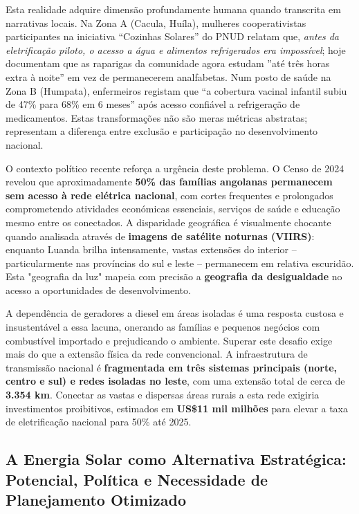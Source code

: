 \documentclass[12pt, a4paper]{article}
\begin{document}
\begin{itemize}
Esta realidade adquire dimensão profundamente humana quando transcrita em narrativas locais. Na Zona A (Cacula, Huíla), mulheres cooperativistas participantes na iniciativa ``Cozinhas Solares'' do PNUD relatam que, \textit{antes da eletrificação piloto, o acesso a água e alimentos refrigerados era impossível}; hoje documentam que as raparigas da comunidade agora estudam ''até três horas extra à noite'' em vez de permanecerem analfabetas. Num posto de saúde na Zona B (Humpata), enfermeiros registam que ``a cobertura vacinal infantil subiu de 47\% para 68\% em 6 meses'' após acesso confiável a refrigeração de medicamentos. Estas transformações não são meras métricas abstratas; representam a diferença entre exclusão e participação no desenvolvimento nacional.

O contexto político recente reforça a urgência deste problema. O Censo de 2024 revelou que aproximadamente \textbf{50\% das famílias angolanas permanecem sem acesso à rede elétrica nacional}, com cortes frequentes e prolongados comprometendo atividades económicas essenciais, serviços de saúde e educação mesmo entre os conectados. A disparidade geográfica é visualmente chocante quando analisada através de \textbf{imagens de satélite noturnas (VIIRS)}: enquanto Luanda brilha intensamente, vastas extensões do interior – particularmente nas províncias do sul e leste – permanecem em relativa escuridão. Esta "geografia da luz" mapeia com precisão a \textbf{geografia da desigualdade} no acesso a oportunidades de desenvolvimento.

A dependência de geradores a diesel em áreas isoladas é uma resposta custosa e insustentável a essa lacuna, onerando as famílias e pequenos negócios com combustível importado e prejudicando o ambiente. Superar este desafio exige mais do que a extensão física da rede convencional. A infraestrutura de transmissão nacional é \textbf{fragmentada em três sistemas principais (norte, centro e sul) e redes isoladas no leste}, com uma extensão total de cerca de \textbf{3.354 km}. Conectar as vastas e dispersas áreas rurais a esta rede exigiria investimentos proibitivos, estimados em \textbf{US\$11 mil milhões} para elevar a taxa de eletrificação nacional para 50\% até 2025.

\subsection{A Energia Solar como Alternativa Estratégica: Potencial, Política e Necessidade de Planejamento Otimizado}


\end{itemize}
\end{document}
